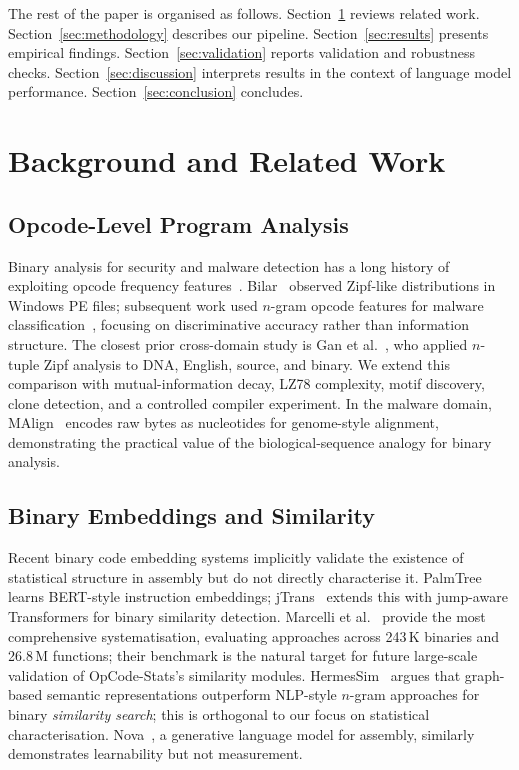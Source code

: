 \documentclass[conference]{IEEEtran}
\begin{document}
The rest of the paper is organised as follows.
Section~\ref{sec:background} reviews related work.
Section~\ref{sec:methodology} describes our pipeline.
Section~\ref{sec:results} presents empirical findings.
Section~\ref{sec:validation} reports validation and robustness checks.
Section~\ref{sec:discussion} interprets results in the context of
language model performance.
Section~\ref{sec:conclusion} concludes.

\section{Background and Related Work}
\label{sec:background}

\subsection{Opcode-Level Program Analysis}
Binary analysis for security and malware detection has a long history of
exploiting opcode frequency
features~\cite{bilar2007opcodes,masud2008machine}.
Bilar~\cite{bilar2007opcodes} observed Zipf-like distributions in Windows
PE files; subsequent work used $n$-gram opcode features for malware
classification~\cite{masud2008machine,santos2013opcode}, focusing on
discriminative accuracy rather than information structure.  The closest
prior cross-domain study is Gan et al.~\cite{gan2009statistical},
who applied $n$-tuple Zipf analysis to DNA, English, source, and binary.
We extend this comparison with mutual-information decay, LZ78 complexity,
motif discovery, clone detection, and a controlled compiler experiment.
In the malware domain, MAlign~\cite{saha2024malign} encodes raw bytes as
nucleotides for genome-style alignment, demonstrating the practical value
of the biological-sequence analogy for binary analysis.

\subsection{Binary Embeddings and Similarity}
Recent binary code embedding systems implicitly validate the existence of
statistical structure in assembly but do not directly characterise it.
PalmTree~\cite{li2021palmtree} learns BERT-style instruction embeddings;
jTrans~\cite{wang2022jtrans} extends this with jump-aware Transformers for
binary similarity detection.  Marcelli et al.~\cite{marcelli2022machine}
provide the most comprehensive systematisation, evaluating approaches
across 243\,K binaries and 26.8\,M functions; their benchmark is the
natural target for future large-scale validation of OpCode-Stats's
similarity modules.  HermesSim~\cite{hermessim2024} argues that
graph-based semantic representations outperform NLP-style $n$-gram
approaches for binary \emph{similarity search}; this is orthogonal to our
focus on statistical characterisation.  Nova~\cite{nova2025}, a generative
language model for assembly, similarly demonstrates learnability but not
measurement.
\end{document}
